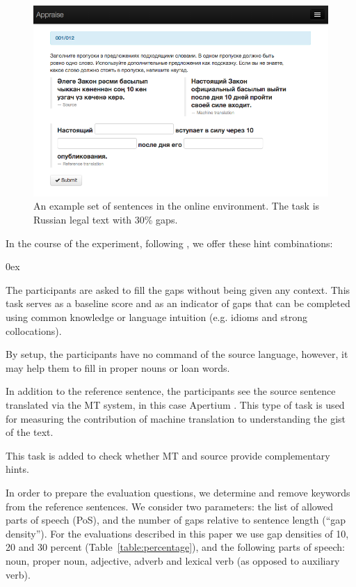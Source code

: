 \documentclass[11pt]{article}
\begin{document}
\begin{figure}
  \centering
\includegraphics[width=1.0\textwidth,resolution=144]{appraise-scr}
 \caption{An example set of sentences in the online environment. The task is Russian legal text with 30\% gaps.}
\label{figure:screenshot}
\end{figure}

In the course of the experiment, following \cite{oregan13}, we offer these hint combinations:
\begin{description}\itemsep 0ex
\item[Reference sentence only:] The participants are asked to fill the gaps without being given
any context. This task serves as a baseline score and as an indicator of gaps
that can be completed using common knowledge or language intuition (e.g.
idioms and strong collocations).
\item[Reference sentence and source sentence:] By setup, the
participants have no command of the source language, however, it may help them to fill
in proper nouns or loan words.
\item[Reference sentence and MT hint:] In addition to the reference sentence, the
participants see the source sentence translated via the MT system, in this case Apertium \citep{forcada11}. This type of task is
used for measuring the contribution of machine translation to understanding the
gist of the text.
\item[Reference sentence and both hints:] This task is
added to check whether MT and source provide complementary hints.
\end{description}

In order to prepare the evaluation questions, we determine and remove keywords from the 
reference sentences. We consider two parameters: the list of allowed parts of speech (PoS), and the 
number of gaps relative to sentence length (``gap density''). For the evaluations described in 
this paper we use gap densities of 10, 20 and 30 percent (Table~\ref{table:percentage}), and the following parts of speech: noun, 
proper noun, adjective, adverb and lexical verb (as opposed to auxiliary verb).
\end{document}

